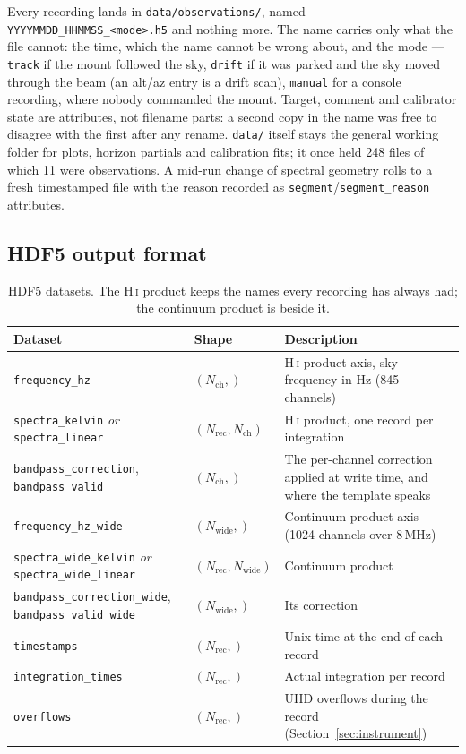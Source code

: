 \documentclass[11pt,a4paper]{article}
\begin{document}
Every recording lands in \texttt{data/observations/}, named \texttt{YYYYMMDD\_HHMMSS\_<mode>.h5} and nothing more. The name carries only what the file cannot: the time, which the name cannot be wrong about, and the mode --- \texttt{track} if the mount followed the sky, \texttt{drift} if it was parked and the sky moved through the beam (an alt/az entry is a drift scan), \texttt{manual} for a console recording, where nobody commanded the mount. Target, comment and calibrator state are attributes, not filename parts: a second copy in the name was free to disagree with the first after any rename. \texttt{data/} itself stays the general working folder for plots, horizon partials and calibration fits; it once held 248 files of which 11 were observations. A mid-run change of spectral geometry rolls to a fresh timestamped file with the reason recorded as \texttt{segment}/\texttt{segment\_reason} attributes.

\subsection{HDF5 output format}

\begin{table}[H]
\centering
\caption{HDF5 datasets. The H\,\textsc{i} product keeps the names every recording has always had; the continuum product is beside it.}
\small
\begin{tabular}{llp{6.6cm}}
\toprule
\textbf{Dataset} & \textbf{Shape} & \textbf{Description} \\
\midrule
\texttt{frequency\_hz} & $(N_\text{ch},)$ & H\,\textsc{i} product axis, sky frequency in Hz (845 channels) \\
\texttt{spectra\_kelvin} \emph{or} \texttt{spectra\_linear} & $(N_\text{rec}, N_\text{ch})$ & H\,\textsc{i} product, one record per integration \\
\texttt{bandpass\_correction}, \texttt{bandpass\_valid} & $(N_\text{ch},)$ & The per-channel correction applied at write time, and where the template speaks \\
\texttt{frequency\_hz\_wide} & $(N_\text{wide},)$ & Continuum product axis (1024 channels over 8\,MHz) \\
\texttt{spectra\_wide\_kelvin} \emph{or} \texttt{spectra\_wide\_linear} & $(N_\text{rec}, N_\text{wide})$ & Continuum product \\
\texttt{bandpass\_correction\_wide}, \texttt{bandpass\_valid\_wide} & $(N_\text{wide},)$ & Its correction \\
\texttt{timestamps} & $(N_\text{rec},)$ & Unix time at the end of each record \\
\texttt{integration\_times} & $(N_\text{rec},)$ & Actual integration per record \\
\texttt{overflows} & $(N_\text{rec},)$ & UHD overflows during the record (Section~\ref{sec:instrument}) \\
\bottomrule
\end{tabular}
\end{table}
\end{document}
